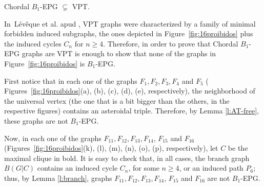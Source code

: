 \begin{theorem}\label{teo:chordalB1inVPT}
Chordal $B_1$-EPG $\subsetneq$ VPT. 
\end{theorem}

In~L{\'e}v{\^e}que et al. \cite{leveque2009characterizing} apud \cite{alcon2015characterizing},  VPT graphs were characterized by a family of minimal forbidden induced subgraphs,
the ones depicted in 
Figure~\ref{fig:16proibidos} plus the induced cycles $C_n$ for $n\geq 4$. Therefore, in order to prove
that Chordal $B_1$-EPG graphs are VPT is enough to show that none of the graphs in Figure~\ref{fig:16proibidos} 
is $B_1$-EPG. %

First notice that in each one of the graphs $F_{1}, F_{2}, F_{3}, F_{4}$ and $F_{5}$ ( Figures~\ref{fig:16proibidos}(a), (b), (c), (d), (e), respectively), the neighborhood of the universal vertex (the one that is a bit bigger than the others, in the respective figures) contains an asteroidal triple. Therefore, by Lemma \ref{l:AT-free}, these graphs are not  $B_1$-EPG.

Now, in each one of the graphs $F_{11}, F_{12}, F_{13}, F_{14}$, $F_{15}$ and $F_{16}$  (Figures~\ref{fig:16proibidos}(k), (l), (m), (n), (o), (p), respectively), let $C$ be the maximal clique in bold. It is easy to check that, in all cases, the branch graph $B(G|C)$ contains an induced cycle $C_n$, for some $n\geq 4$, or an induced path $P_6$; thus, by Lemma \ref{l:branch},  graphs $F_{11}, F_{12}, F_{13}, F_{14}$, $F_{15}$ and $F_{16}$ are not $B_1$-EPG.





